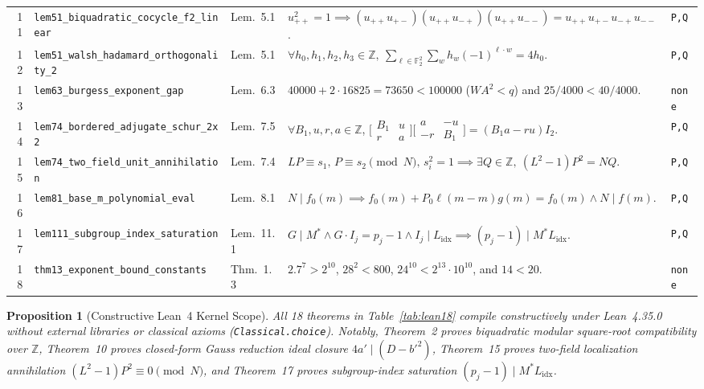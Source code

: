 \documentclass[10pt,twocolumn]{article}
\newtheorem{proposition}{Proposition}
\newcommand{\ZZ}{\mathbb{Z}}
\newcommand{\FF}{\mathbb{F}}
\begin{document}
\begin{table}[t]
\begin{tabular}{@{}r l l p{9.6cm} l@{}}
11 & \texttt{lem51\_biquadratic\_cocycle\_f2\_linear} & Lem.~5.1 & $u_{++}^2=1 \implies (u_{++}u_{+-})(u_{++}u_{-+})(u_{++}u_{--}) = u_{++}u_{+-}u_{-+}u_{--}$. & \texttt{P,Q} \\
12 & \texttt{lem51\_walsh\_hadamard\_orthogonality\_2} & Lem.~5.1 & $\forall h_0,h_1,h_2,h_3\in\ZZ,\ \sum_{\ell\in\FF_2^2}\sum_w h_w(-1)^{\ell\cdot w} = 4 h_0$. & \texttt{P,Q} \\
13 & \texttt{lem63\_burgess\_exponent\_gap} & Lem.~6.3 & $40000 + 2\cdot 16825 = 73650 < 100000$ ($W A^2 < q$) and $25/4000 < 40/4000$. & \texttt{none} \\
14 & \texttt{lem74\_bordered\_adjugate\_schur\_2x2} & Lem.~7.5 & $\forall B_1,u,r,a\in\ZZ$, $\bigl[\begin{smallmatrix}B_1&u\\r&a\end{smallmatrix}\bigr]\bigl[\begin{smallmatrix}a&-u\\-r&B_1\end{smallmatrix}\bigr] = (B_1 a - r u) I_2$. & \texttt{P,Q} \\
15 & \texttt{lem74\_two\_field\_unit\_annihilation} & Lem.~7.4 & $L P\equiv s_1,\,P\equiv s_2\pmod N,\,s_i^2=1 \implies \exists Q\in\ZZ,\ (L^2-1)P^2 = N Q$. & \texttt{P,Q} \\
16 & \texttt{lem81\_base\_m\_polynomial\_eval} & Lem.~8.1 & $N\mid f_0(m) \implies f_0(m)+P_0\ell(m-m)g(m)=f_0(m) \wedge N\mid f(m)$. & \texttt{P,Q} \\
17 & \texttt{lem111\_subgroup\_index\_saturation} & Lem.~11.1 & $G\mid M^* \wedge G\cdot I_j = p_j-1 \wedge I_j\mid L_{\mathrm{idx}} \implies (p_j-1)\mid M^* L_{\mathrm{idx}}$. & \texttt{P,Q} \\
18 & \texttt{thm13\_exponent\_bound\_constants} & Thm.~1.3 & $2.7^7>2^{10}$, $28^2<800$, $24^{10}<2^{13}\cdot 10^{10}$, and $14<20$. & \texttt{none} \\
\bottomrule
\end{tabular}
\end{table}

\begin{proposition}[Constructive Lean~4 Kernel Scope]\label{prop:lean}
\normalfont All 18 theorems in Table~\ref{tab:lean18} compile constructively under Lean~4.35.0 without external libraries or classical axioms (\texttt{Classical.\allowbreak choice}). Notably, Theorem~2 proves biquadratic modular square-root compatibility over $\ZZ$, Theorem~10 proves closed-form Gauss reduction ideal closure $4a'\mid(D-b'^2)$, Theorem~15 proves two-field localization annihilation $(L^2-1)P^2\equiv 0\pmod N$, and Theorem~17 proves subgroup-index saturation $(p_j-1)\mid M^* L_{\mathrm{idx}}$.
\end{proposition}
\end{document}
